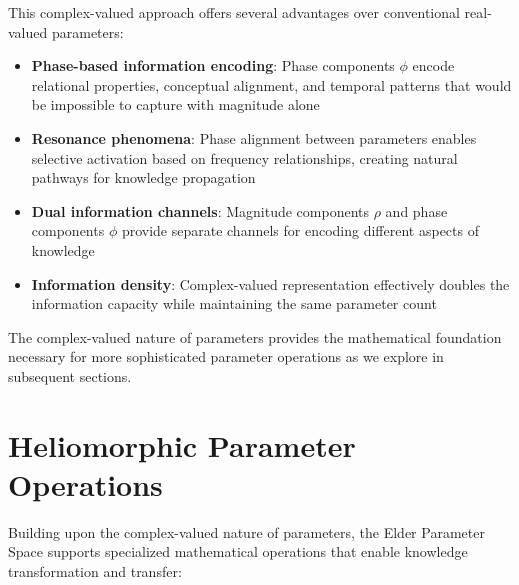 This complex-valued approach offers several advantages over conventional real-valued parameters:
\begin{itemize}
    \item \textbf{Phase-based information encoding}: Phase components $\phi$ encode relational properties, conceptual alignment, and temporal patterns that would be impossible to capture with magnitude alone
    
    \item \textbf{Resonance phenomena}: Phase alignment between parameters enables selective activation based on frequency relationships, creating natural pathways for knowledge propagation
    
    \item \textbf{Dual information channels}: Magnitude components $\rho$ and phase components $\phi$ provide separate channels for encoding different aspects of knowledge
    
    \item \textbf{Information density}: Complex-valued representation effectively doubles the information capacity while maintaining the same parameter count
\end{itemize}

The complex-valued nature of parameters provides the mathematical foundation necessary for more sophisticated parameter operations as we explore in subsequent sections.

\section{Heliomorphic Parameter Operations}

Building upon the complex-valued nature of parameters, the Elder Parameter Space supports specialized mathematical operations that enable knowledge transformation and transfer:

